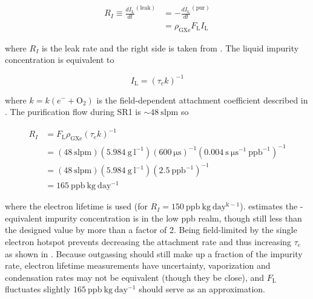 \begin{equation}
\begin{aligned}
R_I \equiv \frac{dI_{\mathrm{L}}}{dt}^{(\mathrm{leak})} &= -\frac{dI_{\mathrm{L}}}{dt}^{(\mathrm{pur})}
\\
&= \rho_{\mathrm{GXe}} F_{\mathrm{L}} I_{\mathrm{L}}
\end{aligned}
\end{equation}

\noindent where $R_I$ is the leak rate and the right side is taken from .  The liquid
impurity concentration is equivalent to

\begin{equation}
I_{\mathrm{L}} = ( \tau_e k)^{-1}
\end{equation}

\noindent where $k = k(e^- + \mathrm{O_2})$ is the field-dependent \electron attachment coefficient described in
.  The purification flow during SR1 is ${\sim} 48\ \mathrm{slpm}$ so

\begin{equation}
\begin{aligned}
R_I &= F_{\mathrm{L}} \rho_{\mathrm{GXe}} (\tau_e k)^{-1} \\[2pt]
&= (48\ \mathrm{slpm}) (5.984\ \mathrm{g\ l^{-1}}) (600\ \mathrm{\mu s})^{-1} (0.004\ \mathrm{s\ \mu s^{-1}\ ppb^{-1}})^{-1} \\[2pt]
&= (48\ \mathrm{slpm}) (5.984\ \mathrm{g\ l^{-1}}) (2.5\ \mathrm{ppb^{-1}})^{-1} \\[2pt]
&= 165\ \mathrm{ppb\ kg\ day^{-1}}
\label{eq:electron_lifetime_model_outgassing_leak}
\end{aligned}
\end{equation}

\noindent where the \alphadecay electron lifetime is used (for
\metakr $R_I = 150\ \mathrm{ppb\ kg\ day^{k-1}}$).   estimates the -equivalent
impurity concentration is in the low ppb realm, though still less than the designed value by more than a factor of 2.  Being field-limited
by the single electron hotspot prevents decreasing the attachment rate and thus increasing $\tau_e$ as shown in
.  Because outgassing should still make up a fraction
of the impurity rate, electron lifetime measurements
have uncertainty, vaporization and condensation rates may not be equivalent (though they be close), and $F_{\mathrm{L}}$ fluctuates
slightly $165\ \mathrm{ppb\ kg\ day^{-1}}$  should serve as an approximation.



